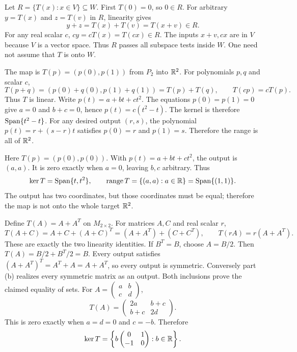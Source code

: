 Let $R=\{T(x):x\in V\}\subseteq W$. First $T(0)=0$, so $0\in R$.
For arbitrary $y=T(x)$ and $z=T(v)$ in $R$, linearity gives
\[
 y+z=T(x)+T(v)=T(x+v)\in R.
\]
For any real scalar $c$, $cy=cT(x)=T(cx)\in R$. The inputs $x+v,cx$
are in $V$ because $V$ is a vector space. Thus $R$ passes all subspace tests
inside $W$. One need not assume that $T$ is onto $W$.

The map is $T(p)=(p(0),p(1))$ from $P_2$ into $\mathbb{R}^2$.
For polynomials $p,q$ and scalar $c$,
\[
 T(p+q)=(p(0)+q(0),p(1)+q(1))=T(p)+T(q),\qquad
 T(cp)=cT(p).
\]
Thus $T$ is linear.
Write $p(t)=a+bt+ct^2$. The equations $p(0)=p(1)=0$ give
$a=0$ and $b+c=0$, hence $p(t)=c(t^2-t)$.
The kernel is therefore $\operatorname{Span}\{t^2-t\}$.
For any desired output $(r,s)$, the polynomial $p(t)=r+(s-r)t$ satisfies
$p(0)=r$ and $p(1)=s$. Therefore the range is all of $\mathbb{R}^2$.

Here $T(p)=(p(0),p(0))$. With $p(t)=a+bt+ct^2$, the output is $(a,a)$.
It is zero exactly when $a=0$, leaving $b,c$ arbitrary. Thus
\[
 \ker T=\operatorname{Span}\{t,t^2\},\qquad
 \operatorname{range}T=\{(a,a):a\in\mathbb{R}\}=\operatorname{Span}\{(1,1)\}.
\]
The output has two coordinates, but those coordinates must be equal;
therefore the map is not onto the whole target $\mathbb{R}^2$.

Define $T(A)=A+A^T$ on $M_{2\times2}$.
For matrices $A,C$ and real scalar $r$,
\[
 T(A+C)=A+C+(A+C)^T=(A+A^T)+(C+C^T),\qquad
 T(rA)=r(A+A^T).
\]
These are exactly the two linearity identities.
If $B^T=B$, choose $A=B/2$. Then
$T(A)=B/2+B^T/2=B$.
Every output satisfies $(A+A^T)^T=A^T+A=A+A^T$, so every output is symmetric.
Conversely part (b) realizes every symmetric matrix as an output. Both
inclusions prove the claimed equality of sets.
For $A=\left(\begin{smallmatrix}a&b\\c&d\end{smallmatrix}\right)$,
\[
 T(A)=\begin{pmatrix}2a&b+c\\b+c&2d\end{pmatrix}.
\]
This is zero exactly when $a=d=0$ and $c=-b$. Therefore
\[
 \ker T=\left\{b\begin{pmatrix}0&1\\-1&0\end{pmatrix}:b\in\mathbb{R}\right\}.
\]

